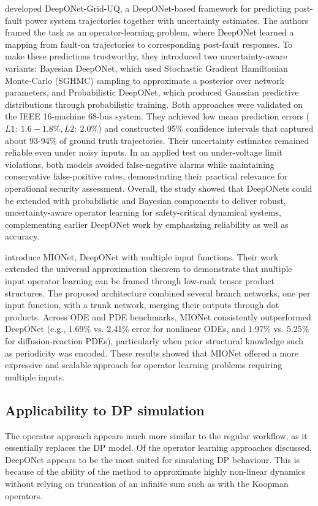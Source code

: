 \textcite{moyaDeepONetGridUQTrustworthyDeep2022} developed DeepONet-Grid-UQ, a DeepONet-based framework for predicting
post-fault power system trajectories together with uncertainty estimates. The authors framed the task as an
operator-learning problem, where DeepONet learned a mapping from fault-on trajectories to corresponding post-fault
responses. To make these predictions trustworthy, they introduced two uncertainty-aware variants: Bayesian DeepONet,
which used Stochastic Gradient Hamiltonian Monte-Carlo (SGHMC) sampling to approximate a posterior over network
parameters, and Probabilistic DeepONet, which produced Gaussian predictive distributions through probabilistic training.
Both approaches were validated on the IEEE 16-machine 68-bus system. They achieved low mean prediction errors (\(L1: ~1.6 -1.8\%, L2: ~2.0\%\)) and constructed 95\% confidence intervals that captured about 93-94\% of ground truth trajectories. Their uncertainty estimates remained reliable even under noisy inputs. In an applied test on under-voltage limit violations, both models avoided false-negative alarms while maintaining conservative false-positive rates, demonstrating their practical relevance for operational security assessment.
Overall, the study showed that DeepONets could be extended with probabilistic and Bayesian components to deliver robust, uncertainty-aware operator learning for safety-critical dynamical systems, complementing earlier DeepONet work by emphasizing reliability as well as accuracy.

\textcite{jinMIONetLearningMultipleInput2022} introduce MIONet, DeepONet with multiple input functions. Their work
extended the universal approximation theorem to demonstrate that multiple input operator learning can be framed through
low-rank tensor product structures. The proposed architecture combined several branch networks, one per input
function, with a trunk network, merging their outputs through dot products. Across ODE and PDE
benchmarks, MIONet consistently outperformed DeepONet (e.g., 1.69\% vs. 2.41\% error for nonlinear ODEs, and 1.97\% vs.
5.25\% for diffusion-reaction PDEs), particularly when prior structural knowledge such as periodicity was encoded. These
results showed that MIONet offered a more expressive and scalable approach for operator learning problems requiring
multiple inputs.

\subsection{Applicability to DP simulation}
The operator approach appears much more similar to the regular workflow, as it essentially replaces the DP model. Of the
operator learning approaches discussed, DeepONet appears to be the most suited for simulating DP behaviour. This is
because of the ability of the method to approximate highly non-linear dynamics without relying on truncation of an
infinite sum such as with the Koopman operators.

